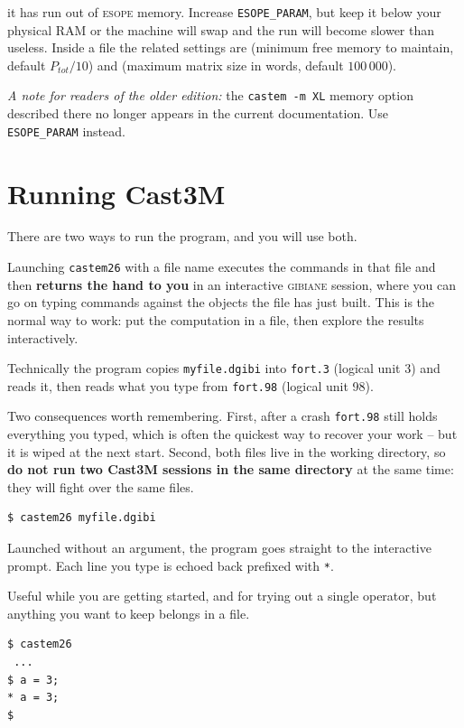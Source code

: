 \noindent it has run out of \textsc{esope} memory. Increase
\texttt{ESOPE\_PARAM}, but keep it below your physical RAM or the machine will
swap and the run will become slower than useless. Inside a file the related
settings are  (minimum free memory to maintain, default
$P_{tot}/10$) and  (maximum matrix size in words, default
$100\,000$).

\medskip
\noindent\emph{A note for readers of the older edition:} the
\texttt{castem -m XL} memory option described there no longer appears in the
current documentation. Use \texttt{ESOPE\_PARAM} instead.

\section{Running Cast3M}
\label{sec:intro:running}

There are two ways to run the program, and you will use both.

\begin{castemcom}
Launching \texttt{castem26} with a file name executes the commands in that
file and then \textbf{returns the hand to you} in an interactive
\textsc{gibiane} session, where you can go on typing commands against the
objects the file has just built. This is the normal way to work: put the
computation in a file, then explore the results interactively.

Technically the program copies \texttt{myfile.dgibi} into \texttt{fort.3}
(logical unit 3) and reads it, then reads what you type from \texttt{fort.98}
(logical unit 98).

\medskip
Two consequences worth remembering. First, after a crash \texttt{fort.98}
still holds everything you typed, which is often the quickest way to recover
your work -- but it is wiped at the next start. Second, both files live in the
working directory, so \textbf{do not run two Cast3M sessions in the same
directory} at the same time: they will fight over the same files.
\end{castemcom}
\begin{castemlines}
\begin{verbatim}
$ castem26 myfile.dgibi
\end{verbatim}
\end{castemlines}

\begin{castemcom}
Launched without an argument, the program goes straight to the interactive
prompt. Each line you type is echoed back prefixed with \texttt{*}.

\medskip
Useful while you are getting started, and for trying out a single operator,
but anything you want to keep belongs in a file.
\end{castemcom}
\begin{castemlines}
\begin{verbatim}
$ castem26
 ...
$ a = 3;
* a = 3;
$
\end{verbatim}
\end{castemlines}

